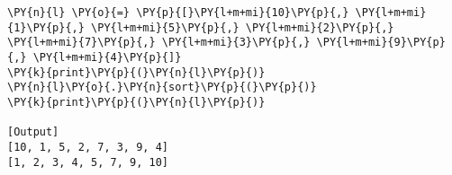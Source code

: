 \begin{Verbatim}[label=\makebox{\url{https://bitbucket.org/lbaldini/programming/src/tip/snippets/timsort.py}},commandchars=\\\{\}]
\PY{n}{l} \PY{o}{=} \PY{p}{[}\PY{l+m+mi}{10}\PY{p}{,} \PY{l+m+mi}{1}\PY{p}{,} \PY{l+m+mi}{5}\PY{p}{,} \PY{l+m+mi}{2}\PY{p}{,} \PY{l+m+mi}{7}\PY{p}{,} \PY{l+m+mi}{3}\PY{p}{,} \PY{l+m+mi}{9}\PY{p}{,} \PY{l+m+mi}{4}\PY{p}{]}
\PY{k}{print}\PY{p}{(}\PY{n}{l}\PY{p}{)}
\PY{n}{l}\PY{o}{.}\PY{n}{sort}\PY{p}{(}\PY{p}{)}
\PY{k}{print}\PY{p}{(}\PY{n}{l}\PY{p}{)}

[Output]
[10, 1, 5, 2, 7, 3, 9, 4]
[1, 2, 3, 4, 5, 7, 9, 10]
\end{Verbatim}